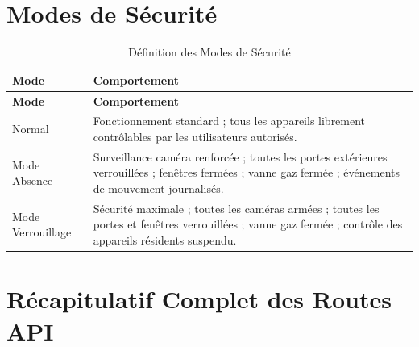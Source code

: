 \section{Modes de Sécurité}

\begin{center}
\begin{longtable}{p{} p{}}
\caption{Définition des Modes de Sécurité}\label{tab:security_modes}\\
\toprule
\textbf{Mode} & \textbf{Comportement} \\
\midrule
\endfirsthead
\toprule
\textbf{Mode} & \textbf{Comportement} \\
\midrule
\endhead
\bottomrule
\endfoot
Normal           & Fonctionnement standard ; tous les appareils librement contrôlables par les utilisateurs autorisés. \\
Mode Absence     & Surveillance caméra renforcée ; toutes les portes extérieures verrouillées ; fenêtres fermées ; vanne gaz fermée ; événements de mouvement journalisés. \\
Mode Verrouillage & Sécurité maximale ; toutes les caméras armées ; toutes les portes et fenêtres verrouillées ; vanne gaz fermée ; contrôle des appareils résidents suspendu. \\
\end{longtable}
\end{center}

\section{Récapitulatif Complet des Routes API}

